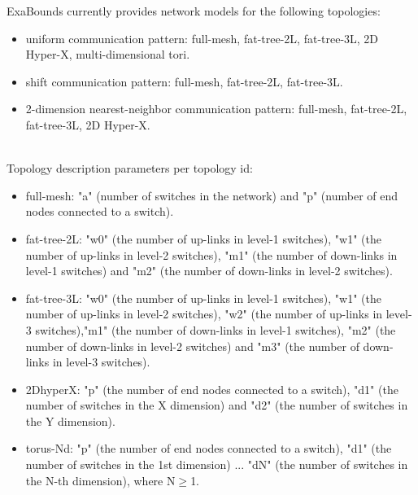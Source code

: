 ExaBounds currently provides network models for the following topologies:
\begin{itemize}
	\item uniform communication pattern: full-mesh, fat-tree-2L, fat-tree-3L, 2D Hyper-X, multi-dimensional tori.
	\item shift communication pattern: full-mesh, fat-tree-2L, fat-tree-3L.
	\item 2-dimension nearest-neighbor communication pattern: full-mesh, fat-tree-2L, fat-tree-3L, 2D Hyper-X.
\end{itemize}

 \\

Topology description parameters per topology id:
\begin{itemize}
	\item full-mesh: "a" (number of switches in the network) and "p" (number of end nodes connected to a switch). 
	\item fat-tree-2L: "w0" (the number of up-links in level-1 switches), "w1" (the number of up-links in level-2 switches), "m1" (the number of down-links in level-1 switches) and "m2" (the number of down-links in level-2 switches).
	\item fat-tree-3L: "w0" (the number of up-links in level-1 switches), "w1" (the number of up-links in level-2 switches), "w2" (the number of up-links in level-3 switches),"m1" (the number of down-links in level-1 switches), "m2" (the number of down-links in level-2 switches) and "m3" (the number of down-links in level-3 switches). 
	\item 2DhyperX: "p" (the number of end nodes connected to a switch), "d1" (the number of switches in the X dimension) and "d2" (the number of switches in the Y dimension). 
	\item torus-Nd: "p" (the number of end nodes connected to a switch), "d1" (the number of switches in the 1st dimension) ... "dN" (the number of switches in the N-th dimension), where N$\geq$1. \\
\end{itemize} 

